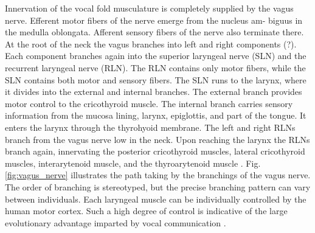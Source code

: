 \documentclass[12pt, letter]{report}
\begin{document}
Innervation of the vocal fold musculature is completely supplied by the vagus nerve. Efferent motor fibers of the nerve emerge from the nucleus am- biguus in the medulla oblongata. Afferent sensory fibers of the nerve also terminate there. At the root of the neck the vagus branches into left and right components (?). Each component branches again into the superior laryngeal nerve (SLN) and the recurrent laryngeal nerve (RLN). The RLN contains only motor fibers, while the SLN contains both motor and sensory fibers. The SLN runs to the larynx, where it divides into the external and internal branches. The external branch provides motor control to the cricothyroid muscle. The internal branch carries sensory information from the mucosa lining, larynx, epiglottis, and part of the tongue. It enters the larynx through the thyrohyoid membrane. The left and right RLNs branch from the vagus nerve low in the neck. Upon reaching the larynx the RLNs branch again, innervating the posterior cricothyroid muscles, lateral cricothyroid muscles, interarytenoid muscle, and the thyroarytenoid muscle \cite{Damrose2003}. Fig. \ref{fig:vagus_nerve} illustrates the path taking by the branchings of the vagus nerve. The order of branching is stereotyped, but the precise branching pattern can vary between individuals. Each laryngeal muscle can be individually controlled by the human motor cortex. Such a high degree of control is indicative of the large evolutionary advantage imparted by vocal communication \cite{Berke2010}. 
\end{document}
